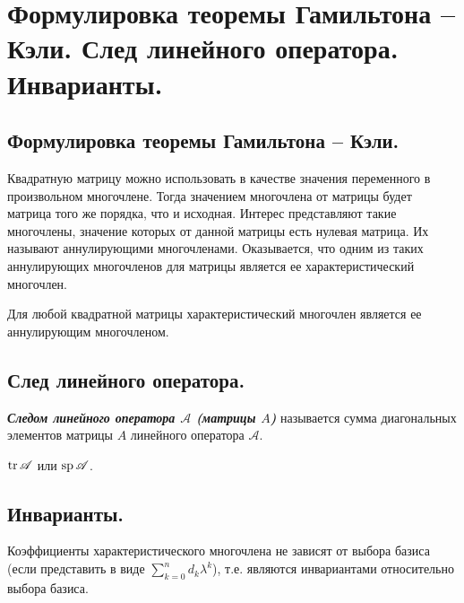 \section{
    Формулировка теоремы Гамильтона – Кэли. След линейного оператора. Инварианты.
}

\subsection{
    Формулировка теоремы Гамильтона – Кэли.
}

Квадратную матрицу можно использовать в качестве значения переменного в произвольном многочлене. Тогда значением многочлена от матрицы будет матрица того же порядка, что и исходная. Интерес представляют такие многочлены, значение которых от данной матрицы есть нулевая матрица. Их называют аннулирующими многочленами. Оказывается, что одним из таких аннулирующих многочленов для матрицы является ее характеристический многочлен.

\begin{theorem}
    Для любой квадратной матрицы характеристический многочлен является ее аннулирующим многочленом.
\end{theorem}

\subsection{
    След линейного оператора.
}

\begin{definition}
    \textbf{\textit{Следом линейного оператора $\mathscr{A}$ (матрицы $A$)}} называется сумма диагональных элементов матрицы $A$ линейного оператора $\mathscr{A}$.
\end{definition}

\begin{designation}
    $\operatorname{\mathop{\mathrm{tr}}} \mathscr{A}$ или $\operatorname{\mathop{\mathrm{sp}}} \mathscr{A}$.
\end{designation}

\subsection{
    Инварианты.
}

Коэффициенты характеристического многочлена не зависят от выбора базиса (если представить в виде $\sum_{k=0}^{n} d_k \lambda^k
$), т.е. являются инвариантами относительно выбора базиса.

\begin{comment}
    Наиболее просто выражается коэффициент $d_{n - 1} = \tr \mathscr{A}$.
\end{comment}

\begin{comment}
    Коэффициент $d_0$ характеристического многочлена совпадает со значением этого многочлена при $\lambda = 0$ и равен определителю линейного оператора $\mathscr{A}$.
\end{comment}
